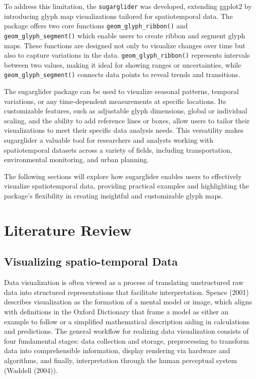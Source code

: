 To address this limitation, the \texttt{sugarglider} was developed, extending ggplot2 by introducing glyph map visualizations tailored for spatiotemporal data. The package offers two core functions \texttt{geom\_glyph\_ribbon()} and \texttt{geom\_glyph\_segment()} which enable users to create ribbon and segment glyph maps. These functions are designed not only to visualize changes over time but also to capture variations in the data. \texttt{geom\_glyph\_ribbon()} represents intervals between two values, making it ideal for showing ranges or uncertainties, while \texttt{geom\_glyph\_segment()} connects data points to reveal trends and transitions.

The sugarglider package can be used to visualize seasonal patterns, temporal variations, or any time-dependent measurements at specific locations. Its customizable features, such as adjustable glyph dimensions, global or individual scaling, and the ability to add reference lines or boxes, allow users to tailor their visualizations to meet their specific data analysis needs. This versatility makes sugarglider a valuable tool for researchers and analysts working with spatiotemporal datasets across a variety of fields, including transportation, environmental monitoring, and urban planning.

The following sections will explore how sugarglider enables users to effectively visualize spatiotemporal data, providing practical examples and highlighting the package's flexibility in creating insightful and customizable glyph maps.

\hypertarget{literature-review}{%
\section{Literature Review}\label{literature-review}}

\hypertarget{visualizing-spatio-temporal-data}{%
\subsection{Visualizing spatio-temporal Data}\label{visualizing-spatio-temporal-data}}

Data visualization is often viewed as a process of translating unstructured raw data into structured representations that facilitate interpretation. Spence (2001) describes visualization as the formation of a mental model or image, which aligns with definitions in the Oxford Dictionary that frame a model as either an example to follow or a simplified mathematical description aiding in calculations and predictions. The general workflow for realizing data visualization consists of four fundamental stages: data collection and storage, preprocessing to transform data into comprehensible information, display rendering via hardware and algorithms, and finally, interpretation through the human perceptual system (Waddell (2004)).

